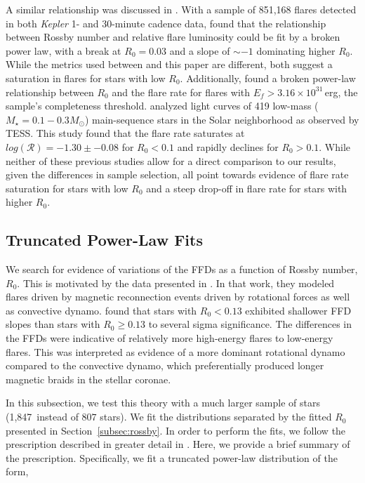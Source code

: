 \documentclass[twocolumn]{aastex631}
\newcommand{\nprot}{1,847}
\begin{document}
A similar relationship was discussed in \cite{Davenport16}. With a sample of 851,168 flares detected in both \textit{Kepler} 1- and 30-minute cadence data, \cite{Davenport16} found that the relationship between Rossby number and relative flare luminosity could be fit by a broken power law, with a break at $R_0 = 0.03$ and a slope of $\sim -1$ dominating higher $R_0$. While the metrics used between \cite{Davenport16} and this paper are different, both suggest a saturation in flares for stars with low $R_0$. Additionally, \cite{medina20} found a broken power-law relationship between $R_0$ and the flare rate for flares with $E_f > 3.16 \times 10^{31}$\,erg, the sample's completeness threshold. \cite{medina20} analyzed light curves of 419 low-mass ($M_\star = 0.1 - 0.3 M_\odot$) main-sequence stars in the Solar neighborhood as observed by TESS.  This study found that the flare rate saturates at $log(\mathcal{R}) = -1.30 \pm -0.08$ for $R_0 < 0.1$ and rapidly declines for $R_0 > 0.1$. While neither of these previous studies allow for a direct comparison to our results, given the differences in sample selection, all point towards evidence of flare rate saturation for stars with low $R_0$ and a steep drop-off in flare rate for stars with higher $R_0$.


\subsection{Truncated Power-Law Fits}\label{subsec3_truncated}

We search for evidence of variations of the FFDs as a function of Rossby number, $R_0$. This is motivated by the data  presented in \cite{seligman22}. In that work, they  modeled flares driven by magnetic reconnection events driven by rotational forces as well as convective dynamo.  \cite{seligman22} found that stars with $R_0 < 0.13$ exhibited shallower FFD slopes than stars with $R_0 \geq 0.13$ to several sigma significance. The differences in the FFDs were indicative of relatively more high-energy flares to low-energy flares. This was interpreted as evidence of a more dominant rotational dynamo compared to the convective dynamo, which preferentially produced longer magnetic braids in the stellar coronae.

In this subsection, we test this theory with a much larger sample of stars (\nprot\ instead of $807$ stars). We fit the distributions separated by the fitted $R_0$ presented in Section~\ref{subsec:rossby}. In order to perform the fits, we follow the prescription described in greater detail in \cite{seligman22}. Here, we provide a brief summary of the prescription. Specifically, we fit a truncated power-law distribution of the form,
\end{document}

